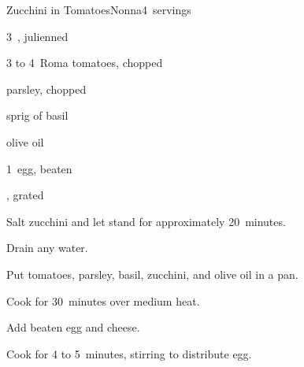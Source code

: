 \begin{recipe}{Zucchini in Tomatoes}{Nonna}{4~servings}

\begin{ingredients}
\item 3~, julienned
\item 3 to 4~Roma tomatoes, chopped
\item {} parsley, chopped
\item sprig of basil
\item olive oil
\item 1~egg, beaten
\item {} , grated
\end{ingredients}

\begin{directions}
\item Salt zucchini and let stand for approximately 20~minutes.
\item Drain any water.
\item Put tomatoes, parsley, basil, zucchini, and olive oil in a pan.
\item Cook for 30~minutes over medium heat.
\item Add beaten egg and cheese.
\item Cook for 4 to 5~minutes, stirring to distribute egg.
\end{directions}

\end{recipe}
